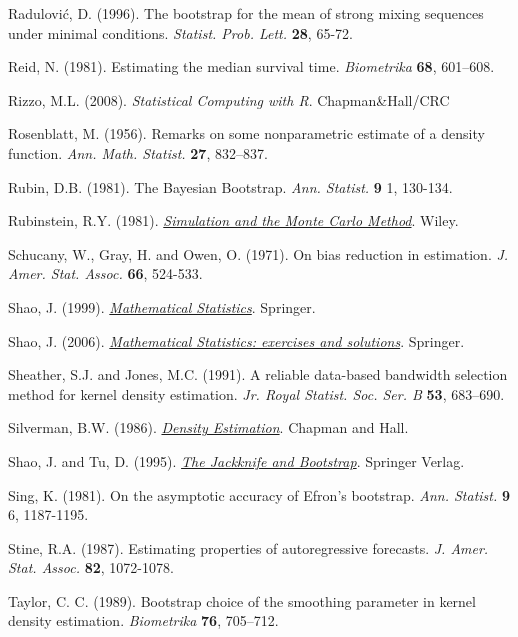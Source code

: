 \documentclass[]{book}
\theoremstyle{break}
\theoremstyle{definition}
\theoremstyle{definition}
\theoremstyle{definition}
\theoremstyle{remark}
\begin{document}
Radulović, D. (1996). The bootstrap for the mean of strong mixing
sequences under minimal conditions. \emph{Statist. Prob. Lett.}
\textbf{28}, 65-72.

Reid, N. (1981). Estimating the median survival time. \emph{Biometrika}
\textbf{68}, 601--608.

Rizzo, M.L. (2008). \emph{Statistical Computing with R}.
Chapman\&Hall/CRC

Rosenblatt, M. (1956). Remarks on some nonparametric estimate of a
density function. \emph{Ann. Math. Statist.} \textbf{27}, 832--837.

Rubin, D.B. (1981). The Bayesian Bootstrap. \emph{Ann. Statist.}
\textbf{9} 1, 130-134.

Rubinstein, R.Y. (1981).
\href{https://books.google.es/books?hl=es\&lr=\&id=r2VODQAAQBAJ\&oi=fnd\&pg=PR1\&dq=Simulation+and+the+Monte+Carlo+Method}{\emph{Simulation
and the Monte Carlo Method}}. Wiley.

Schucany, W., Gray, H. and Owen, O. (1971). On bias reduction in
estimation. \emph{J. Amer. Stat. Assoc.} \textbf{66}, 524-533.

Shao, J. (1999).
\href{https://www.springer.com/gp/book/9780387953823}{\emph{Mathematical
Statistics}}. Springer.

Shao, J. (2006).
\href{http://www.stewartschultz.com/statistics/books/Mathematical\%20Statistics\%20-\%20Exercises\%20and\%20Solutions.pdf}{\emph{Mathematical
Statistics: exercises and solutions}}. Springer.

Sheather, S.J. and Jones, M.C. (1991). A reliable data-based bandwidth
selection method for kernel density estimation. \emph{Jr. Royal Statist.
Soc. Ser. B} \textbf{53}, 683--690.

Silverman, B.W. (1986).
\href{http://users.stat.ufl.edu/~rrandles/sta6934/smhandout.pdf}{\emph{Density
Estimation}}. Chapman and Hall.

Shao, J. and Tu, D. (1995).
\href{https://books.google.es/books?hl=es\&lr=\&id=VO3SBwAAQBAJ\&oi=fnd\&pg=PA1\&dq=The+Jackknife+and+Bootstrap}{\emph{The
Jackknife and Bootstrap}}. Springer Verlag.

Sing, K. (1981). On the asymptotic accuracy of Efron's bootstrap.
\emph{Ann. Statist.} \textbf{9} 6, 1187-1195.

Stine, R.A. (1987). Estimating properties of autoregressive forecasts.
\emph{J. Amer. Stat. Assoc.} \textbf{82}, 1072-1078.

Taylor, C. C. (1989). Bootstrap choice of the smoothing parameter in
kernel density estimation. \emph{Biometrika} \textbf{76}, 705--712.
\end{document}

